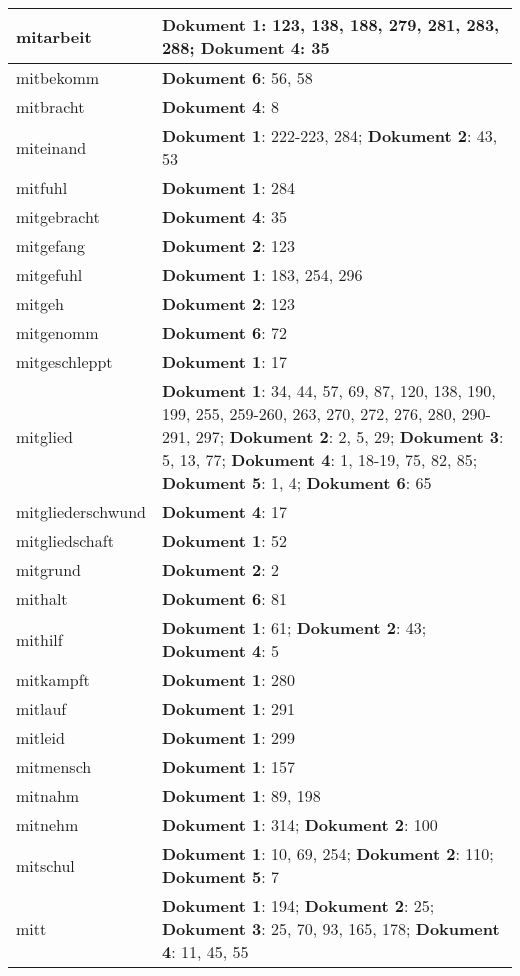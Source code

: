 \documentclass[a5paper]{article}
\begin{document}
\begin{longtable}[l]{|l|p{3in}|}
\hline
mitarbeit & \textbf{Dokument 1}: 123, 138, 188, 279, 281, 283, 288; \textbf{Dokument 4}: 35 \\
\hline
mitbekomm & \textbf{Dokument 6}: 56, 58 \\
\hline
mitbracht & \textbf{Dokument 4}: 8 \\
\hline
miteinand & \textbf{Dokument 1}: 222-223, 284; \textbf{Dokument 2}: 43, 53 \\
\hline
mitfuhl & \textbf{Dokument 1}: 284 \\
\hline
mitgebracht & \textbf{Dokument 4}: 35 \\
\hline
mitgefang & \textbf{Dokument 2}: 123 \\
\hline
mitgefuhl & \textbf{Dokument 1}: 183, 254, 296 \\
\hline
mitgeh & \textbf{Dokument 2}: 123 \\
\hline
mitgenomm & \textbf{Dokument 6}: 72 \\
\hline
mitgeschleppt & \textbf{Dokument 1}: 17 \\
\hline
mitglied & \textbf{Dokument 1}: 34, 44, 57, 69, 87, 120, 138, 190, 199, 255, 259-260, 263, 270, 272, 276, 280, 290-291, 297; \textbf{Dokument 2}: 2, 5, 29; \textbf{Dokument 3}: 5, 13, 77; \textbf{Dokument 4}: 1, 18-19, 75, 82, 85; \textbf{Dokument 5}: 1, 4; \textbf{Dokument 6}: 65 \\
\hline
mitgliederschwund & \textbf{Dokument 4}: 17 \\
\hline
mitgliedschaft & \textbf{Dokument 1}: 52 \\
\hline
mitgrund & \textbf{Dokument 2}: 2 \\
\hline
mithalt & \textbf{Dokument 6}: 81 \\
\hline
mithilf & \textbf{Dokument 1}: 61; \textbf{Dokument 2}: 43; \textbf{Dokument 4}: 5 \\
\hline
mitkampft & \textbf{Dokument 1}: 280 \\
\hline
mitlauf & \textbf{Dokument 1}: 291 \\
\hline
mitleid & \textbf{Dokument 1}: 299 \\
\hline
mitmensch & \textbf{Dokument 1}: 157 \\
\hline
mitnahm & \textbf{Dokument 1}: 89, 198 \\
\hline
mitnehm & \textbf{Dokument 1}: 314; \textbf{Dokument 2}: 100 \\
\hline
mitschul & \textbf{Dokument 1}: 10, 69, 254; \textbf{Dokument 2}: 110; \textbf{Dokument 5}: 7 \\
\hline
mitt & \textbf{Dokument 1}: 194; \textbf{Dokument 2}: 25; \textbf{Dokument 3}: 25, 70, 93, 165, 178; \textbf{Dokument 4}: 11, 45, 55 \\

\end{longtable}
\end{document}
